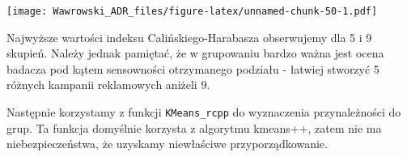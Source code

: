 \documentclass[
]{book}
\newenvironment{Shaded}{\begin{snugshade}}{\end{snugshade}}
\newcommand{\ControlFlowTok}[1]{\textcolor[rgb]{0.13,0.29,0.53}{\textbf{#1}}}
\newcommand{\DataTypeTok}[1]{\textcolor[rgb]{0.13,0.29,0.53}{#1}}
\newcommand{\DecValTok}[1]{\textcolor[rgb]{0.00,0.00,0.81}{#1}}
\newcommand{\KeywordTok}[1]{\textcolor[rgb]{0.13,0.29,0.53}{\textbf{#1}}}
\newcommand{\NormalTok}[1]{#1}
\newcommand{\OperatorTok}[1]{\textcolor[rgb]{0.81,0.36,0.00}{\textbf{#1}}}
\newcommand{\StringTok}[1]{\textcolor[rgb]{0.31,0.60,0.02}{#1}}
\begin{document}
\begin{Shaded}
\end{Shaded}

\texttt{[image: Wawrowski\_ADR\_files/figure-latex/unnamed-chunk-50-1.pdf]}

Najwyższe wartości indeksu Calińskiego-Harabasza obserwujemy dla 5 i 9 skupień. Należy jednak pamiętać, że w grupowaniu bardzo ważna jest ocena badacza pod kątem sensowności otrzymanego podziału - łatwiej stworzyć 5 różnych kampanii reklamowych aniżeli 9.

Następnie korzystamy z funkcji \texttt{KMeans\_rcpp} do wyznaczenia przynależności do grup. Ta funkcja domyślnie korzysta z algorytmu kmeans++, zatem nie ma niebezpieczeństwa, że uzyskamy niewłaściwe przyporządkowanie.

\begin{Shaded}
\end{Shaded}
\end{document}
